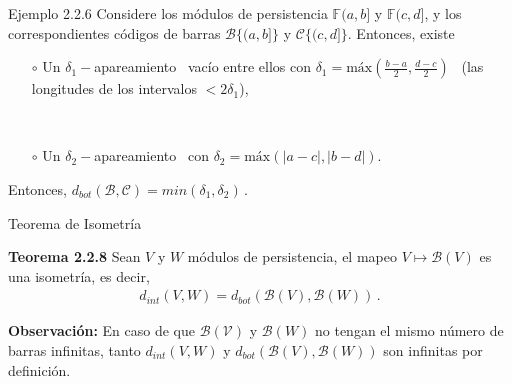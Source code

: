 \documentclass{beamer}
\def\matching{apareamiento}
\begin{document}
\begin{frame}{Ejemplo 2.2.6}
Considere los m\'odulos de persistencia $\mathbb{F}(a,b]$ y $\mathbb{F}(c,d]$, y los correspondientes c\'odigos de barras $\mathcal{B}\{(a,b]\}$ y $\mathcal{C}\{(c,d]\}$. Entonces, existe
\begin{itemize}
\item[$\circ$] Un $\delta_1-$\matching~ vac\'io entre ellos con $\delta_1=\mbox{m\'ax}\left(\frac{b-a}{2},\frac{d-c}{2}\right)\,\,\,$ (las longitudes de los intervalos $<2\delta_1$),\\
\item[] $\,$\hspace{10em}\scalebox{1.2}{\'o existe}\hspace{10em} $\,$\\
\item[$\circ$] Un $\delta_2-$\matching~ con $\delta_2=\mbox{m\'ax}\left( |a-c|,|b-d|\right)$.
\end{itemize}
\vspace{1em}
Entonces, $d_{bot}\left( \mathcal{B},\mathcal{C}\right)=min\left(\delta_1,\delta_2 \right)\,.$
\end{frame}

\begin{frame}{Teorema de Isometr\'ia}
\begin{block}{\textbf{Teorema 2.2.8}}
Sean $V$ y $W$ m\'odulos de persistencia, el mapeo $V\mapsto \mathcal{B}(V)$ es una isometr\'ia, es decir,
\begin{gather*}
d_{int}\left( V,W \right) =d_{bot}\left( \mathcal{B}(V),\mathcal{B}(W)\right)\,.
\end{gather*}
\scalebox{0.7}{(Demostraci\'on en el Cap\'itulo 3).}
\end{block}
\vspace{1em}
\hfill\begin{minipage}{0.8\textwidth}
\textbf{Observaci\'on: }En caso de que $\mathcal{B(V)}$ y $\mathcal{B}(W)$ no tengan el mismo n\'umero de barras infinitas, tanto $d_{int}(V,W)$ y $d_{bot}(\mathcal{B}(V),\mathcal{B}(W))$ son infinitas por definici\'on.
\end{minipage}
\end{frame}
\end{document}
